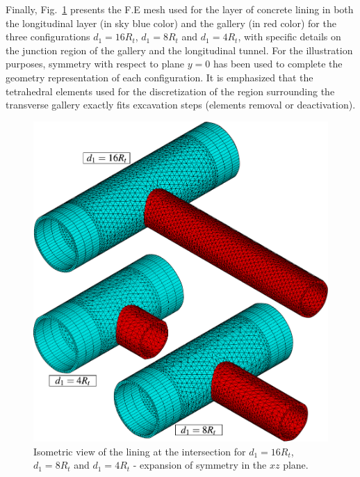 \documentclass[Journal,letterpaper, NoLists,SectionNumbers]{ascelike-new}
\begin{document}
Finally, Fig.~\ref{Mesh6} presents the F.E mesh used for the layer of concrete lining in both the longitudinal layer (in sky blue color) and the gallery (in red color) for the three configurations $d_1=16R_t$, $d_1=8R_t$ and $d_1=4R_t$, with specific details on the junction region of the gallery and the longitudinal tunnel. For the illustration purposes, symmetry with respect to plane $y = 0$ has been used to complete the geometry representation of each configuration. It is emphasized that the tetrahedral elements used for the discretization of the region surrounding the transverse gallery exactly fits excavation steps (elements removal or deactivation).

\begin{figure}[h!]
	\centering
	\includegraphics[scale=0.6]{Mesh6.pdf}
	\caption{Isometric view of the lining at the intersection for $d_1=16R_t$, $d_1=8R_t$ and $d_1=4R_t$ - expansion of symmetry in the $xz$ plane.}
	\label{Mesh6}
\end{figure}
\end{document}
